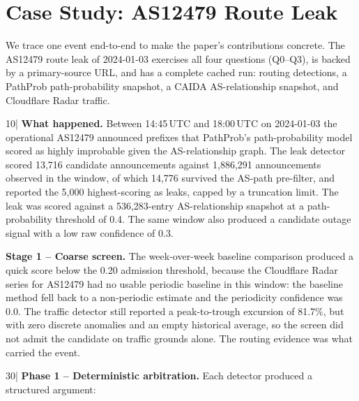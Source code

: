 \section{Case Study: AS12479 Route Leak}
\label{sec:casestudy}

We trace one event end-to-end to make the paper's
contributions concrete. The AS12479 route leak of 2024-01-03
exercises all four questions (Q0--Q3), is backed by a primary-source
URL, and has a complete cached run: routing detections, a
PathProb path-probability snapshot, a CAIDA AS-relationship
snapshot, and Cloudflare Radar traffic.

    10|\medskip
\noindent\textbf{What happened.} Between 14:45\,UTC and 18:00\,UTC
on 2024-01-03 the operational AS12479 announced prefixes that
PathProb's path-probability model scored as highly improbable given
the AS-relationship graph. The leak detector scored 13{,}716 candidate
announcements against 1{,}886{,}291 announcements observed in the
window, of which 14{,}776 survived the AS-path pre-filter, and
reported the 5{,}000 highest-scoring as leaks, capped by a
truncation limit. The leak was scored against a 536{,}283-entry
AS-relationship snapshot at a path-probability threshold of 0.4.
The same window also produced a candidate outage signal with a
low raw confidence of 0.3.

\medskip
\noindent\textbf{Stage 1 -- Coarse screen.} The week-over-week
baseline comparison produced a quick score below the 0.20
admission threshold, because the Cloudflare Radar series for
AS12479 had no usable periodic baseline in this window:
the baseline method fell back to a non-periodic estimate and
the periodicity confidence was 0.0. The traffic detector still
reported a peak-to-trough excursion of 81.7\%, but with zero
discrete anomalies and an empty historical average, so the
screen did not admit the candidate on traffic grounds alone.
The routing evidence was what carried the event.

    30|\medskip
\noindent\textbf{Phase 1 -- Deterministic arbitration.}
Each detector produced a structured argument:

